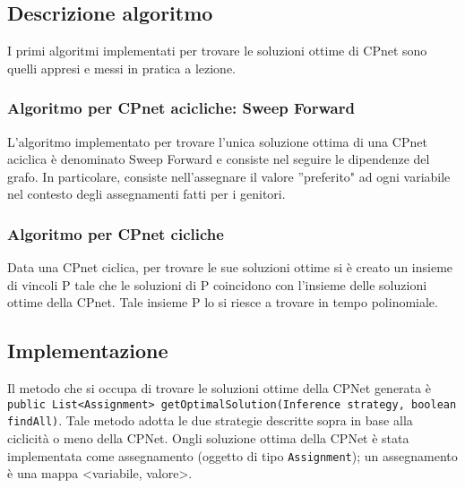 \subsection{Descrizione algoritmo}
I primi algoritmi implementati per trovare le soluzioni ottime di CPnet sono quelli appresi e messi in pratica a lezione.

\subsubsection{Algoritmo per CPnet acicliche: Sweep Forward}
L'algoritmo implementato per trovare l'unica soluzione ottima di una CPnet aciclica è denominato Sweep Forward e consiste nel seguire le dipendenze del grafo. In particolare, consiste nell'assegnare il valore ''preferito" ad ogni variabile nel contesto degli assegnamenti fatti per i genitori.

\subsubsection{Algoritmo per CPnet cicliche}
Data una CPnet ciclica, per trovare le sue soluzioni ottime si è creato un insieme di vincoli P tale che le soluzioni di P coincidono con l'insieme delle soluzioni ottime della CPnet. Tale insieme P lo si riesce a  trovare in tempo polinomiale.

\subsection{Implementazione}
Il metodo che si occupa di trovare le soluzioni ottime della CPNet generata è \texttt{public List<Assignment> getOptimalSolution(Inference strategy, boolean findAll)}. Tale metodo adotta le due strategie descritte sopra in base alla ciclicità o meno della CPNet.
Ongli soluzione ottima della CPNet è stata implementata come assegnamento (oggetto di tipo \texttt{Assignment}); un assegnamento è una mappa <variabile, valore>.

